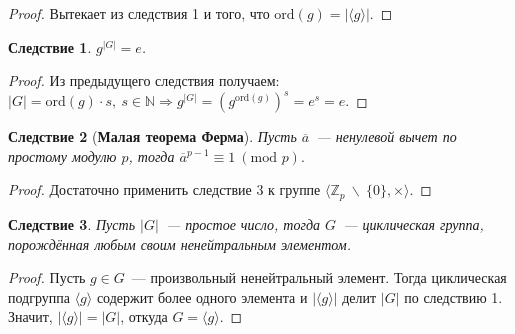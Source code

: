 \documentclass[a4paper, 14pt]{extarticle}
\newcommand{\integers}{\mathbb{Z}}
\newcommand{\naturals}{\mathbb{N}}
\newcommand{\ord}{\mathrm{ord}}
\renewcommand{\mod}{\mathrm{mod} \,}
\theoremstyle{definition}
\theoremstyle{plain}
\numberwithin{theorem}{section}
\numberwithin{definition}{section}
\numberwithin{statement}{section}
\numberwithin{lemma}{section}
\newtheorem{consequence}{Следствие}
\numberwithin{consequence}{section}
\begin{document}
	\begin{proof}
		Вытекает из следствия 1 и того, что $\ord(g) = |\langle g \rangle|$.
	\end{proof}
	\begin{consequence}
		$g^{|G|} = e$.
	\end{consequence}
	\begin{proof}
		Из предыдущего следствия получаем: ${|G| = \ord(g) \cdot s, \ s \in \naturals} \Longrightarrow g^{|G|} = (g^{\ord(g)})^s = e^s = e.$
	\end{proof}
	\begin{consequence}[\textbf{Малая теорема Ферма}]
		Пусть $\overline{a}$~--- ненулевой вычет по простому модулю $p$, тогда $\overline{a}^{p-1} \equiv 1 \ (\mod \, p).$
	\end{consequence}
	\begin{proof}
		Достаточно применить следствие 3 к группе $\langle \integers_p \ \backslash \ \{0\}, \times \rangle.$
	\end{proof}
	\begin{consequence}
		Пусть $|G|$~--- простое число, тогда $G$~--- циклическая группа, порождённая любым своим ненейтральным элементом.
	\end{consequence}
	\begin{proof}
		Пусть $g \in G$~--- произвольный ненейтральный элемент. Тогда циклическая подгруппа $\langle g \rangle$ содержит более одного элемента и $|\langle g \rangle|$ делит $|G|$ по следствию 1. Значит, $|\langle g \rangle| = |G|$, откуда $G = \langle g \rangle$. 
	\end{proof}
	\newpage
\end{document}
